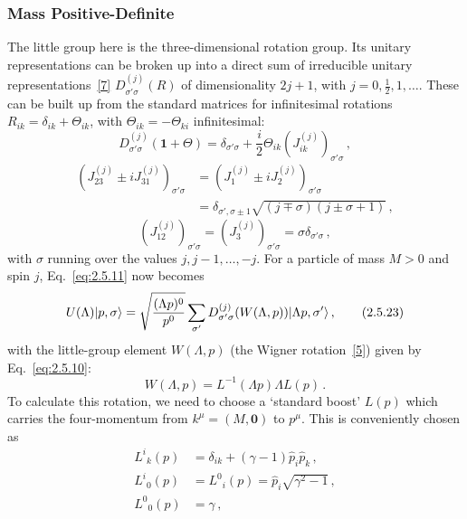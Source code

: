 \subsubsection*{Mass Positive-Definite}

The little group here is the three-dimensional rotation group. Its unitary
representations can be broken up into a direct sum of irreducible unitary
representations~\hyperref[ref:2.7]{[7]} $D^{(j)}_{\sigma'\sigma}(R)$ of dimensionality
$2j+1$, with $j=0,\tfrac12,1,\ldots$. These can be built up from the standard
matrices for infinitesimal rotations $R_{ik}=\delta_{ik}+\Theta_{ik}$, with
$\Theta_{ik}=-\Theta_{ki}$ infinitesimal:
\begin{equation}
D^{(j)}_{\sigma'\sigma}(\mathbf{1}+\Theta)
=\delta_{\sigma'\sigma}
+\frac{i}{2}\Theta_{ik}(J^{(j)}_{ik})_{\sigma'\sigma}\,,
\tag{2.5.20}\label{eq:2.5.20}
\end{equation}
\begin{equation}
\begin{aligned}
(J^{(j)}_{23}\pm iJ^{(j)}_{31})_{\sigma'\sigma}
&=(J^{(j)}_1\pm iJ^{(j)}_2)_{\sigma'\sigma}\\
&=\delta_{\sigma',\sigma\pm1}
\sqrt{(j\mp\sigma)(j\pm\sigma+1)}\,,
\end{aligned}
\tag{2.5.21}\label{eq:2.5.21}
\end{equation}
\begin{equation}
(J^{(j)}_{12})_{\sigma'\sigma}
=(J^{(j)}_3)_{\sigma'\sigma}
=\sigma\delta_{\sigma'\sigma}\,,
\tag{2.5.22}\label{eq:2.5.22}
\end{equation}
with $\sigma$ running over the values $j,j-1,\ldots,-j$. For a particle of
mass $M>0$ and spin $j$, Eq.~\eqref{eq:2.5.11} now becomes
\begin{equation}
U(\Lambda)\lvert p,\sigma\rangle
=\sqrt{\frac{(\Lambda p)^0}{p^0}}
\sum_{\sigma'}D^{(j)}_{\sigma'\sigma}(W(\Lambda,p))
\lvert \Lambda p,\sigma'\rangle\,,
\tag{2.5.23}\label{eq:2.5.23}
\end{equation}
with the little-group element $W(\Lambda,p)$ (the Wigner
rotation~\hyperref[ref:2.5]{[5]}) given by Eq.~\eqref{eq:2.5.10}:
\[
W(\Lambda,p)=L^{-1}(\Lambda p)\Lambda L(p)\,.
\]
To calculate this rotation, we need to choose a `standard boost' $L(p)$ which
carries the four-momentum from $k^\mu=(M,\mathbf{0})$ to $p^\mu$. This is
conveniently chosen as
\begin{equation}
\begin{aligned}
L^i{}_k(p)&=\delta_{ik}+(\gamma-1)\hat p_i\hat p_k\,,\\
L^i{}_0(p)&=L^0{}_i(p)=\hat p_i\sqrt{\gamma^2-1}\,,\\
L^0{}_0(p)&=\gamma\,,
\end{aligned}
\tag{2.5.24}\label{eq:2.5.24}
\end{equation}
